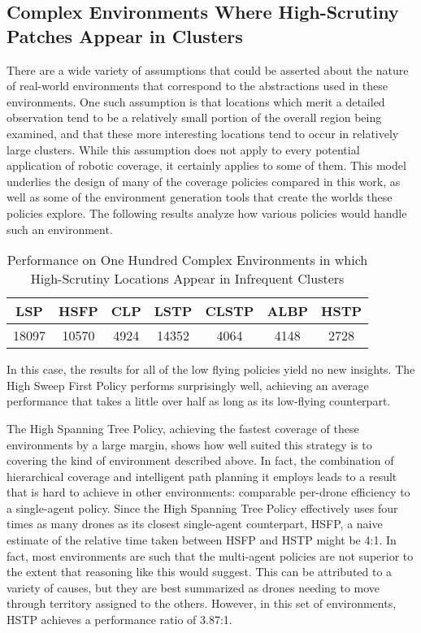 \subsection{Complex Environments Where High-Scrutiny Patches Appear in Clusters}

There are a wide variety of assumptions that could be asserted about the nature of real-world environments that correspond to the abstractions used in these environments. One such assumption is that locations which merit a detailed observation tend to be a relatively small portion of the overall region being examined, and that these more interesting locations tend to occur in relatively large clusters. While this assumption does not apply to every potential application of robotic coverage, it certainly applies to some of them. This model underlies the design of many of the coverage policies compared in this work, as well as some of the environment generation tools that create the worlds these policies explore. The following results analyze how various policies would handle such an environment.

\begin{table}[h]
\begin{center}
 \begin{tabular}{||c c c c c c c ||}
 \hline
 LSP   & HSFP  & CLP  & LSTP  & CLSTP & ALBP & HSTP \\
 \hline
 18097 & 10570  & 4924 & 14352 & 4064  & 4148 & 2728 \\
 \hline
 \end{tabular}
\end{center}
\caption{Performance on One Hundred Complex Environments in which High-Scrutiny Locations Appear in Infrequent Clusters}
\end{table}

In this case, the results for all of the low flying policies yield no new insights. The High Sweep First Policy performs surprisingly well, achieving an average performance that takes a little over half as long as its low-flying counterpart.

The High Spanning Tree Policy, achieving the fastest coverage of these environments by a large margin, shows how well suited this strategy is to covering the kind of environment described above. In fact, the combination of hierarchical coverage and intelligent path planning it employs leads to a result that is hard to achieve in other environments: comparable per-drone efficiency to a single-agent policy. Since the High Spanning Tree Policy effectively uses four times as many drones as its closest single-agent counterpart, HSFP, a naive estimate of the relative time taken between HSFP and HSTP might be 4:1. In fact, most environments are such that the multi-agent policies are not superior to the extent that reasoning like this would suggest. This can be attributed to a variety of causes, but they are best summarized as drones needing to move through territory assigned to the others. However, in this set of environments, HSTP achieves a performance ratio of 3.87:1.

